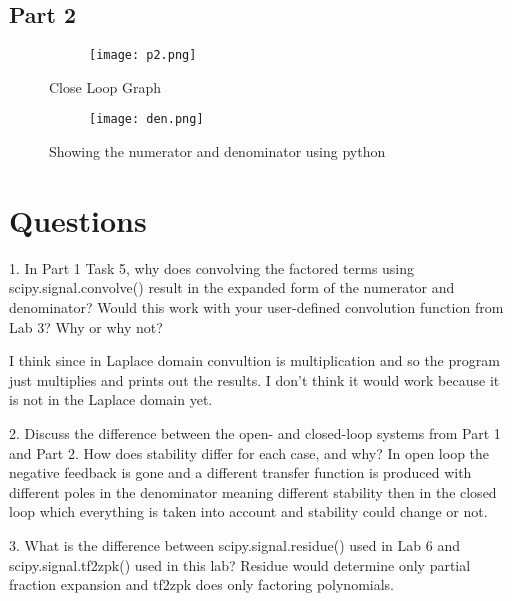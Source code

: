 \documentclass[12pt,a4paper]{article}
\begin{document}
\subsection{Part 2}


\begin{figure}[h]
\centering
\begin{subfigure}{ 1\textwidth}
\texttt{[image: p2.png]}
\end{subfigure}
\caption{ Close Loop Graph}
\label{fig2:image22}
\end{figure}

\begin{figure}[h]
\centering
\begin{subfigure}{ 1\textwidth}
\texttt{[image: den.png]}
\end{subfigure}
\caption{ Showing the numerator and denominator using python }
\label{fig2:image22}
\end{figure}
\clearpage
\clearpage







\section{Questions}\label{sec:res}

1. In Part 1 Task 5, why does convolving the factored terms using scipy.signal.convolve()
result in the expanded form of the numerator and denominator? Would this work with your
user-defined convolution function from Lab 3? Why or why not? \newline

\noindent  I think since in Laplace domain convultion is multiplication and so the program just multiplies and prints out the results. I don't think it would work because it is not in the Laplace domain yet.

2. Discuss the difference between the open- and closed-loop systems from Part 1 and Part 2.
How does stability differ for each case, and why? \newline 
\noindent In open loop the negative feedback is gone and a different transfer function is produced with different poles in the denominator meaning different stability then in the closed loop which everything is taken into account and stability could change or not.

3. What is the difference between scipy.signal.residue() used in Lab 6 and
scipy.signal.tf2zpk() used in this lab?\newline
\noindent Residue would determine only partial fraction expansion and tf2zpk does only factoring polynomials.
\end{document}
